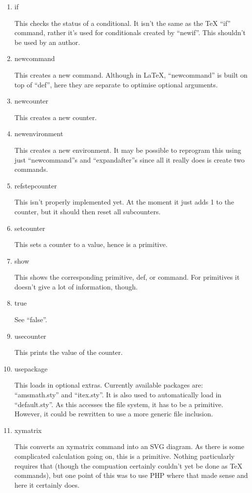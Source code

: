 \documentclass{webpage}
\begin{document}
\begin{enumerate}
\item if

This checks the status of a conditional.
It isn't the same as the TeX ``if'' command, rather it's used for conditionals created by ``newif''.
This shouldn't be used by an author.

\item newcommand

This creates a new command.
Although in LaTeX, ``newcommand'' is built on top of ``def'', here they are separate to optimise optional arguments.

\item newcounter

This creates a new counter.

\item newenvironment

This creates a new environment.
It may be possible to reprogram this using just ``newcommand''s and ``expandafter''s since all it really does is create two commands.

\item refstepcounter

This isn't properly implemented yet.
At the moment it just adds 1 to the counter, but it should then reset all subcounters.

\item setcounter

This sets a counter to a value, hence is a primitive.

\item show

This shows the corresponding primitive, def, or command.
For primitives it doesn't give a lot of information, though.

\item true

See ``false''.

\item usecounter

This prints the value of the counter.

\item usepackage

This loads in optional extras.
Currently available packages are: ``amsmath.sty'' and ``itex.sty''.
It is also used to automatically load in ``default.sty''.
As this accesses the file system, it has to be a primitive.
However, it could be rewritten to use a more generic file inclusion.

\item xymatrix

This converts an xymatrix command into an SVG diagram.
As there is some complicated calculation going on, this is a primitive.
Nothing particularly requires that (though the compuation certainly couldn't yet be done as TeX commands), but one point of this was to use PHP where that made sense and here it certainly does.
\end{enumerate}
\end{document}
